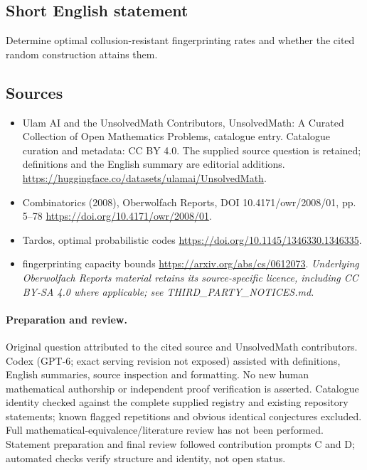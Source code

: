 \documentclass[11pt]{article}
\begin{document}
\subsection{Short English statement}
Determine optimal collusion-resistant fingerprinting rates and whether the cited random construction attains them.
\subsection{Sources}
\begin{itemize}
\item[\hypertarget{source:statement:1}{S1}] Ulam AI and the UnsolvedMath Contributors, UnsolvedMath: A Curated Collection of Open Mathematics Problems, catalogue entry. Catalogue curation and metadata: CC BY 4.0. The supplied source question is retained; definitions and the English summary are editorial additions.
\url{https://huggingface.co/datasets/ulamai/UnsolvedMath}.
\item[\hypertarget{source:statement:2}{S2}] Combinatorics (2008), Oberwolfach Reports, DOI 10.4171/owr/2008/01, pp. 5--78
\url{https://doi.org/10.4171/owr/2008/01}.
\item[\hypertarget{source:statement:3}{S3}] Tardos, optimal probabilistic codes
\url{https://doi.org/10.1145/1346330.1346335}.
\item[\hypertarget{source:statement:4}{S4}] fingerprinting capacity bounds
\url{https://arxiv.org/abs/cs/0612073}.
\textit{Underlying Oberwolfach Reports material retains its source-specific licence, including CC BY-SA 4.0 where applicable; see THIRD\_PARTY\_NOTICES.md.}
\end{itemize}
\paragraph{Preparation and review.}
Original question attributed to the cited source and UnsolvedMath contributors. Codex (GPT-6; exact serving revision not exposed) assisted with definitions, English summaries, source inspection and formatting. No new human mathematical authorship or independent proof verification is asserted. Catalogue identity checked against the complete supplied registry and existing repository statements; known flagged repetitions and obvious identical conjectures excluded. Full mathematical-equivalence/literature review has not been performed. Statement preparation and final review followed contribution prompts C and D; automated checks verify structure and identity, not open status.
\label{end:statement}
\end{document}
